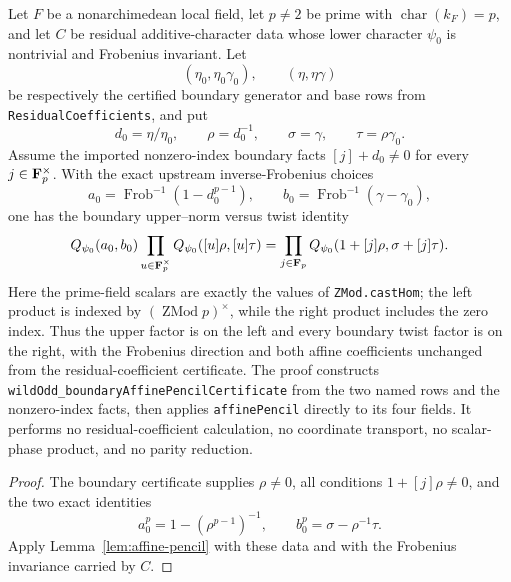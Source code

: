 \begin{theorem}\label{mod:cases-wildodd-boundarypencil}
Let $F$ be a nonarchimedean local field, let $p\ne2$ be prime with
$\operatorname{char}(k_F)=p$, and let $C$ be residual additive-character
data whose lower character $\psi_0$ is nontrivial and Frobenius invariant.
Let
\[
 (\eta_0,\eta_0\gamma_0),\qquad (\eta,\eta\gamma)
\]
be respectively the certified boundary generator and base rows from
\texttt{ResidualCoefficients}, and put
\[
 d_0=\eta/\eta_0,\qquad
 \rho=d_0^{-1},\qquad
 \sigma=\gamma,\qquad
 \tau=\rho\gamma_0.
\]
Assume the imported nonzero-index boundary facts
$[j]+d_0\ne0$ for every $j\in\mathbf F_p^\times$.  With the exact upstream
inverse-Frobenius choices
\[
 a_0=\operatorname{Frob}^{-1}(1-d_0^{p-1}),
 \qquad
 b_0=\operatorname{Frob}^{-1}(\gamma-\gamma_0),
\]
one has the boundary upper--norm versus twist identity
\[
 Q_{\psi_0}(a_0,b_0)
 \prod_{u\in\mathbf F_p^\times}Q_{\psi_0}([u]\rho,[u]\tau)
 =
 \prod_{j\in\mathbf F_p}
 Q_{\psi_0}(1+[j]\rho,\sigma+[j]\tau).
\]
Here the prime-field scalars are exactly the values of
\texttt{ZMod.castHom}; the left product is indexed by
$(\operatorname{ZMod}p)^\times$, while the right product includes the zero
index.  Thus the upper factor is on the left and every boundary twist factor
is on the right, with the Frobenius direction and both affine coefficients
unchanged from the residual-coefficient certificate.
\leanok
{}
\FormalizationContract
The proof constructs
\texttt{wildOdd\_boundaryAffinePencilCertificate} from the two named rows
and the nonzero-index facts, then applies \texttt{affinePencil} directly to
its four fields.  It performs no residual-coefficient calculation, no
coordinate transport, no scalar-phase product, and no parity reduction.
\end{theorem}
\begin{proof}
The boundary certificate supplies $\rho\ne0$, all conditions
$1+[j]\rho\ne0$, and the two exact identities
\[
 a_0^p=1-(\rho^{p-1})^{-1},
 \qquad
 b_0^p=\sigma-\rho^{-1}\tau.
\]
Apply Lemma~\ref{lem:affine-pencil} with these data and with the Frobenius
invariance carried by $C$.
\end{proof}

